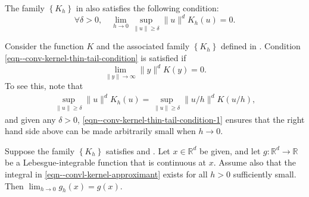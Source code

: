 \begin{assumption}
\label{asm--convl-kernel-conv-thin-tail}
The family \(\left\{ K_{h} \right\}\) in
 also satisfies the following condition:
\begin{equation}
  \forall \delta > 0, \quad
  \lim_{h \to 0} \sup_{\|u\| \geq \delta} \|u\|^{d} K_{h} (u) = 0.
  \label{eqn--conv-kernel-thin-tail-condition}
\end{equation}
\end{assumption}

\begin{remark}
Consider the function \(K\) and the associated family \(\left\{ K_{h} \right\}\)
defined in .
Condition \eqref{eqn--conv-kernel-thin-tail-condition} is satisfied if
\begin{equation}
  \lim_{\|y\| \to \infty} \|y\|^{d} K (y) = 0.
  \label{eqn--conv-kernel-thin-tail-condition-1}
\end{equation}
To see this, note that
\begin{align*}
  \sup_{\|u\| \geq \delta} \|u\|^{d} K_{h} (u) = \sup_{\|u\| \geq \delta} \| u /
  h \|^{d} K (u / h),
\end{align*}
and given any \(\delta > 0\), \eqref{eqn--conv-kernel-thin-tail-condition-1}
ensures that the right hand side above can be made arbitrarily small when \(h
\to 0\).
\end{remark}

\begin{theorem}
\label{thm--convl-kernel-conv-thin-tail}
Suppose the family \(\left\{ K_{h} \right\}\) satisfies
 and .
Let \(x \in \mathbb{R}^{d}\) be given, and let \(g : \mathbb{R}^{d} \to
\mathbb{R}\) be a Lebesgue-integrable function that is continuous at \(x\).
Assume also that the integral in \eqref{eqn--convl-kernel-approximant} exists
for all \(h > 0\) sufficiently small.
Then \(\lim_{h \to 0} g_{h} (x) = g (x)\).
\end{theorem}

